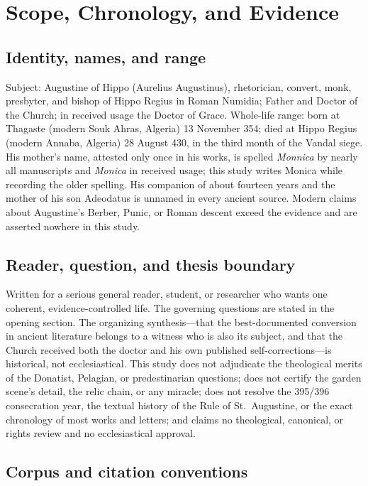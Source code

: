 \section{Scope, Chronology, and Evidence}

\subsection{Identity, names, and range}

Subject: Augustine of Hippo (Aurelius Augustinus), rhetorician, convert,
monk, presbyter, and bishop of Hippo Regius in Roman Numidia; Father and
Doctor of the Church; in received usage the Doctor of Grace. Whole-life
range: born at Thagaste (modern Souk Ahras, Algeria) 13 November 354; died
at Hippo Regius (modern Annaba, Algeria) 28 August 430, in the third month
of the Vandal siege. His mother's name, attested only once in his works, is
spelled \textit{Monnica} by nearly all manuscripts and \textit{Monica} in
received usage; this study writes Monica while recording the older
spelling. His companion of about fourteen years and the mother of his son
Adeodatus is unnamed in every ancient source. Modern claims about
Augustine's Berber, Punic, or Roman descent exceed the evidence and are
asserted nowhere in this study.

\subsection{Reader, question, and thesis boundary}

Written for a serious general reader, student, or researcher who wants one
coherent, evidence-controlled life. The governing questions are stated in
the opening section. The organizing synthesis---that the best-documented
conversion in ancient literature belongs to a witness who is also its
subject, and that the Church received both the doctor and his own published
self-corrections---is historical, not ecclesiastical. This study does not
adjudicate the theological merits of the Donatist, Pelagian, or
predestinarian questions; does not certify the garden scene's detail, the
relic chain, or any miracle; does not resolve the 395/396 consecration
year, the textual history of the Rule of St.~Augustine, or the exact
chronology of most works and letters; and claims no theological, canonical,
or rights review and no ecclesiastical approval.

\subsection{Corpus and citation conventions}

